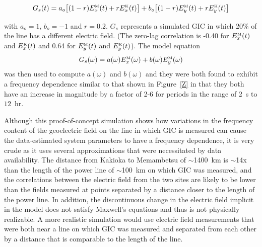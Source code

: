 \documentclass[draft,linenumbers]{agujournal2018}
\begin{document}
\begin{equation}
G_s(t)=a_o\big[(1-r)E^{\mbox{\tiny M}}_x(t) + rE^{\mbox{\tiny K}}_x(t)\big]+b_o\big[(1-r)E^{\mbox{\tiny M}}_y(t) + rE^{\mbox{\tiny K}}_y(t)\big]
\end{equation}

\noindent
with $a_o=1$, $b_o=-1$ and $r=0.2$. $G_s$ represents a simulated GIC in which 20\% of the line has a different electric field. (The zero-lag correlation is -0.40 for $E^{\mbox{\tiny M}}_x(t)$ and $E^{\mbox{\tiny K}}_x(t)$ and 0.64 for $E^{\mbox{\tiny M}}_y(t)$ and $E^{\mbox{\tiny K}}_y(t)$). The model equation
\begin{equation}
G_s(\omega)=a(\omega)E^{\mbox{\tiny M}}_x(\omega)+b(\omega)E^{\mbox{\tiny M}}_y(\omega)
\end{equation}
\noindent
was then used to compute $a(\omega)$ and $b(\omega)$ and they were both found to exhibit a frequency dependence similar to that shown in Figure~\ref{Z} in that they both have an increase in magnitude by a factor of 2-6 for periods in the range of $2$~s to $12$~hr.

Although this proof-of-concept simulation shows how variations in the frequency content of the geoelectric field on the line in which GIC is measured can cause the data-estimated system parameters to have a frequency dependence, it is very crude as it uses several approximations that were necessitated by data availability. The distance from Kakioka to Memambetsu of $\sim$1400~km is $\sim$14x than the length of the power line of $\sim$100~km on which GIC was measured, and the correlations between the electric field from the two sites are likely to be lower than the fields measured at points separated by a distance closer to the length of the power line. In addition, the discontinuous change in the electric field implicit in the model does not satisfy Maxwell's equations and thus is not physically realizable. A more realistic simulation would use electric field measurements that were both near a line on which GIC was measured and separated from each other by a distance that is comparable to the length of the line.


\end{document}
